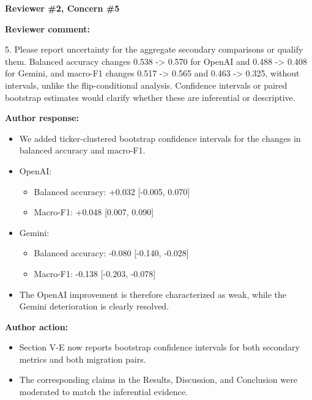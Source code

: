 \documentclass[11pt]{article}
\newcommand{\rvcomment}[1]{{\color{ReviewerGreen}#1}}
\newcommand{\concern}[1]{\textbf{\color{ReviewerGreen}#1}}
\begin{document}
\vspace{12pt}
\concern{Reviewer \#2, Concern \#5}

\concern{Reviewer comment:}

\rvcomment{5. Please report uncertainty for the aggregate secondary comparisons or qualify them. Balanced accuracy changes 0.538 -> 0.570 for OpenAI and 0.488 -> 0.408 for Gemini, and macro-F1 changes 0.517 -> 0.565 and 0.463 -> 0.325, without intervals, unlike the flip-conditional analysis. Confidence intervals or paired bootstrap estimates would clarify whether these are inferential or descriptive.}

\textbf{Author response:}

\begin{itemize}

\item We added ticker-clustered bootstrap confidence intervals for the changes in balanced accuracy and macro-F1.

\item OpenAI:

\begin{itemize}

\item Balanced accuracy: +0.032 [-0.005, 0.070]

\item Macro-F1: +0.048 [0.007, 0.090]

\end{itemize}

\item Gemini:

\begin{itemize}

\item Balanced accuracy: -0.080 [-0.140, -0.028]

\item Macro-F1: -0.138 [-0.203, -0.078]

\end{itemize}

\item The OpenAI improvement is therefore characterized as weak, while the Gemini deterioration is clearly resolved.

\end{itemize}

\textbf{Author action:}

\begin{itemize}

\item Section V-E now reports bootstrap confidence intervals for both secondary metrics and both migration pairs.

\item The corresponding claims in the Results, Discussion, and Conclusion were moderated to match the inferential evidence.

\end{itemize}
\end{document}

